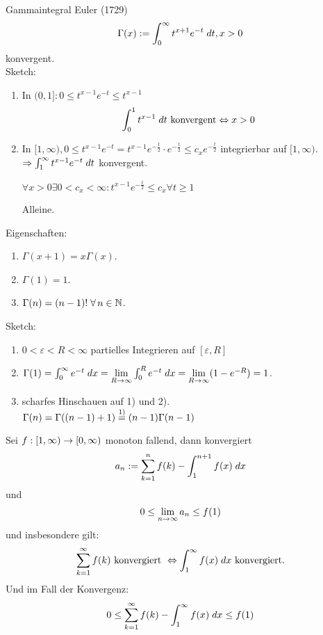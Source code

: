 \documentclass[../ana2.tex]{subfiles}
\begin{document}
\begin{bsp}
    Gammaintegral  Euler (1729)
    \[ \Gamma(x) := \integralx{t^{x+1}e^{-t}}{0}{\infty}{t}, x > 0 \]
    konvergent. \\
    Sketch: 
    \begin{enumerate}
        \item In \( (0, 1]: 0 \leq t^{x-1}e^{-t} \leq t^{x-1} \)
        \[ \integralx{t^{x-1}}{0}{1}{t} \text{ konvergent} 
        \Leftrightarrow x > 0 \]
        \item In \( [1,\infty), 0 \leq t^{x-1} e^{-t} 
        = t^{x-1} e^{-\frac{t}{2}} \cdot e^{-\frac{t}{2}}
        \leq c_x e^{-\frac{t}{2}} \) integrierbar 
        auf \( [1,\infty) \).
        \( \Rightarrow \integralx{t^{x-1}e^{-t}}{1}{\infty}{t} \)
        konvergent.
        \begin{beh}
            \( \forall x > 0 \exists 0 < c_x < \infty: 
            t^{x-1}e^{-\frac{t}{2}} \leq c_x \forall t \geq 1 \)
        \end{beh}
        \begin{bew}
            Alleine.
        \end{bew}
    \end{enumerate}
    Eigenschaften:
    \begin{enumerate}
        \item \( \Gamma(x+1) = x \Gamma(x) \).
        \item \(\Gamma(1) = 1\).
        \item \( \Gamma(n) = (n-1)! \;\forall n\in\N \).
    \end{enumerate}
    Sketch:
    \begin{enumerate}
        \item \( 0 < \varepsilon < R < \infty \) 
        partielles Integrieren auf \( [\varepsilon, R] \)
        \item \( \Gamma(1) 
        = \integral{e^{-t}}{0}{\infty} 
        = \limes{R} \integral{e^{-t}}{0}{R} 
        = \limes{R} (1 - e^{-R}) = 1 \).
        \item scharfes Hinschauen auf 1) und 2). \\
        \( \Gamma(n) = \Gamma((n-1)+1) 
        \oversett{1)}{=} (n-1)\Gamma(n-1) \)
    \end{enumerate}
\end{bsp}
\begin{satz}
    Sei \( \abb{f}{[1,\infty)}{[0,\infty)} \) monoton 
    fallend, dann konvergiert 
    \[ a_n := \sum_{k=1}^n f(k) 
    - \integral{f(x)}{1}{n+1} \]    
    und 
    \[ 0 \leq \limes{n} a_n \leq f(1) \]
    und insbesondere gilt:
    \[ \sum_{k=1}^\infty f(k) \text{ konvergiert }
    \Leftrightarrow \integral{f(x)}{1}{\infty} 
    \text{ konvergiert}. \]
    Und im Fall der Konvergenz:
    \[ 0 \leq \sum_{k=1}^\infty f(k) - \integral{f(x)}{1}{\infty} 
    \leq f(1) \]
\end{satz}
\end{document}
